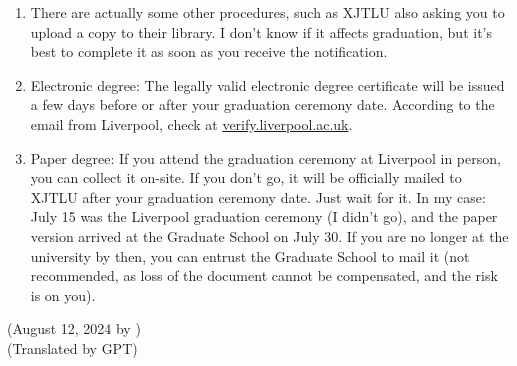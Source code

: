 \begin{enumerate}
    \item There are actually some other procedures, such as XJTLU also asking you to upload a copy to their library. I don't know if it affects graduation, but it's best to complete it as soon as you receive the notification.
    \item Electronic degree: The legally valid electronic degree certificate will be issued a few days before or after your graduation ceremony date. According to the email from Liverpool, check at \url{verify.liverpool.ac.uk}.
    \item Paper degree: If you attend the graduation ceremony at Liverpool in person, you can collect it on-site. If you don't go, it will be officially mailed to XJTLU after your graduation ceremony date. Just wait for it. In my case: July 15 was the Liverpool graduation ceremony (I didn't go), and the paper version arrived at the Graduate School on July 30. If you are no longer at the university by then, you can entrust the Graduate School to mail it (not recommended, as loss of the document cannot be compensated, and the risk is on you).
\end{enumerate}

\begin{flushright}
    (August 12, 2024 by \Wu) \\
    (Translated by GPT)
\end{flushright}